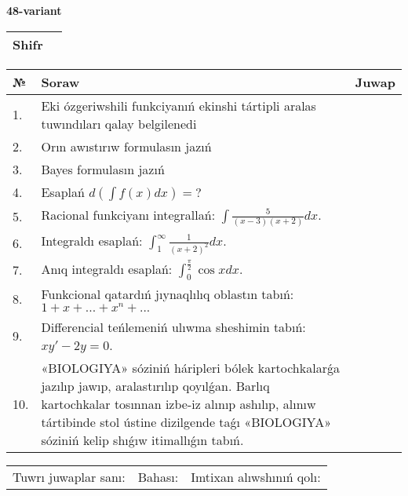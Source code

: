 \documentclass{article}
\begin{document}
  \egroup
  
  \newpage
  
  
  \textbf{48-variant}\\
  
  \bgroup
  \def\arraystretch{1.6} %
  
  \begin{tabular}{|m{5.7cm}|m{9.5cm}|}
  \hline
  Shifr & \\
  \hline
  \end{tabular}
  
  \vspace{1cm}
  
  \begin{tabular}{|m{0.7cm}|m{10cm}|m{4cm}|}
  \hline
  № & Soraw & Juwap \\
  \hline
  1. & Eki ózgeriwshili funkciyanıń ekinshi tártipli aralas tuwındıları qalay belgilenedi &  \\
  \hline
  2. & Orın awıstırıw formulasın jazıń &  \\
  \hline
  3. & Bayes formulasın jazıń &  \\
  \hline
  4. & Esaplań \(d\left( \int{f(x)dx} \right) = ?\) &  \\
  \hline
  5. & Racional funkciyanı integrallań: \(\int{\frac{5}{(x - 3)(x + 2)}dx}\). &  \\
  \hline
  6. & Integraldı esaplań: \(\int_{1}^{\infty}{\frac{1}{(x + 2)^2 }dx}\). &  \\
  \hline
  7. & Anıq integraldı esaplań: \(\int_{0}^{\frac{\pi}{2}}{\cos xdx}\). &  \\
  \hline
  8. & Funkcional qatardıń jıynaqlılıq oblastın tabıń:\(1 + x + ... + x^{n} + ...\) &  \\
  \hline
  9. & Differencial teńlemeniń ulıwma sheshimin tabıń: \(xy' - 2y = 0\). &  \\
  \hline
  10. & «BIOLOGIYA» sóziniń háripleri bólek kartochkalarǵa jazılıp jawıp, aralastırılıp qoyılǵan. Barlıq kartochkalar tosınnan izbe-iz alınıp ashılıp, alınıw tártibinde stol ústine dizilgende taǵı «BIOLOGIYA» sóziniń kelip shıǵıw itimallıǵın tabıń. &  \\
  \hline
  \end{tabular}
  
  \vspace{1cm}
  
  \begin{tabular}{lll}
  Tuwrı juwaplar sanı: \underline{\hspace{1.5cm}} & 
  Bahası: \underline{\hspace{1.5cm}} & 
  Imtixan alıwshınıń qolı: \underline{\hspace{2cm}} \\
  \end{tabular}
  
\end{document}
